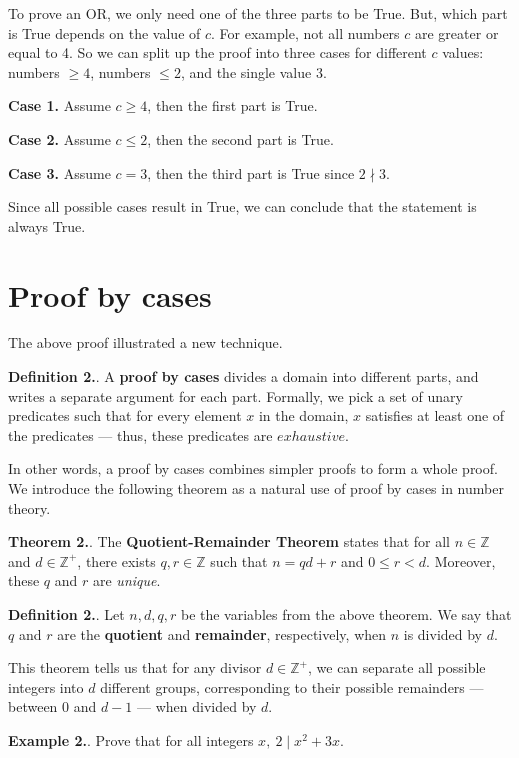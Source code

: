 \documentclass{article}
\newcounter{defcount}
\newcounter{excount}
\newcounter{thcount}
\newcommand\df{\stepcounter{defcount} \textbf{Definition 2.\thedefcount}. }
\newcommand\ex{\stepcounter{excount} \textbf{Example 2.\theexcount}. }
\newcommand\tr{\stepcounter{thcount} \textbf{Theorem 2.\thethcount}. }
\begin{document}
To prove an OR, we only need one of the three parts to be True. But, which 
part is True depends on the value of $c$. For example, not all numbers $c$ are 
greater or equal to 4. So we can split up the proof into three cases for different 
$c$ values: numbers $\geq 4$, numbers $\leq 2$, and the single value 3. 

\textbf{Case 1.} Assume $c \geq 4$, then the first part is True.

\textbf{Case 2.} Assume $c \leq 2$, then the second part is True.

\textbf{Case 3.} Assume $c = 3$, then the third part is True since $2 \nmid 3$.

Since all possible cases result in True, we can conclude that the statement is always True.

\section{Proof by cases}
The above proof illustrated a new technique. 

\df A \textbf{proof by cases} divides a domain into different parts, and writes 
a separate argument for each part. Formally, we pick a set of unary predicates 
such that for every element $x$ in the domain, $x$ satisfies at least one of 
the predicates --- thus, these predicates are $exhaustive$.

In other words, a proof by cases combines simpler proofs to form a whole proof. 
We introduce the following theorem as a natural use of proof by cases in number theory.

\tr The \textbf{Quotient-Remainder Theorem} states that for all $n \in \mathbb{Z}$ 
and $d \in \mathbb{Z}^+$, there exists $q, r \in \mathbb{Z}$ such that 
$n = qd + r$ and $0 \leq r < d$. Moreover, these $q$ and $r$ are \textit{unique}. 

\df Let $n, d, q, r$ be the variables from the above theorem. We say that 
$q$ and $r$ are the \textbf{quotient} and \textbf{remainder}, respectively, 
when $n$ is divided by $d$.

This theorem tells us that for any divisor $d \in \mathbb{Z}^+$, we can separate 
all possible integers into $d$ different groups, corresponding to their 
possible remainders --- between 0 and $d-1$ --- when divided by $d$. 

\ex Prove that for all integers $x, \: 2 \mid x^2 + 3x$.
\end{document}
